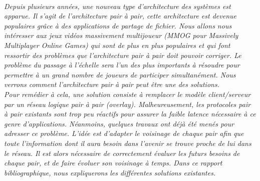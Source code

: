 \\
	\par \textit{Depuis plusieurs années, une nouveau type d'architecture des systèmes est apparue. Il s'agit de l'architecture pair à pair, cette architecture est devenue populaires grâce à des applications de partage de fichier. Nous allons nous intéresser aux jeux vidéos massivement multijoueur (MMOG pour Massively Multiplayer Online Games) qui sont de plus en plus populaires et qui font ressortir des problèmes que l'architecture pair à pair doit pouvoir corriger. Le problème du passage à l'échelle sera l'un des plus importants à résoudre pour permettre à un grand nombre de joueurs de participer simultanément. Nous verrons comment l'architecture pair à pair peut être une des solutions.\\ 
	 Pour remédier à cela, une solution consiste à remplacer le modèle client/serveur par un réseau logique pair à pair (overlay). Malheureusement, les protocoles pair à pair existants sont trop peu réactifs pour assurer la faible latence nécessaire à ce genre d’applications. Néanmoins, quelques travaux ont déjà été menés pour adresser ce problème. L’idée est d’adapter le voisinage de chaque pair afin que toute l’information dont il aura besoin dans l'avenir se trouve proche de lui dans le réseau. Il est alors nécessaire de correctement évaluer les futurs besoins de chaque pair, et de faire évoluer son voisinage à temps. Dans ce rapport bibliographique, nous expliquerons les différentes solutions existantes.}\\
